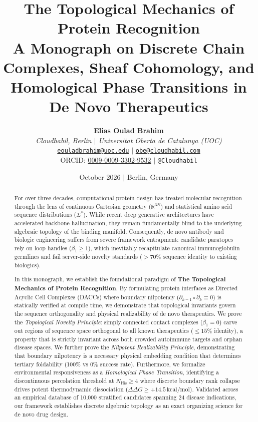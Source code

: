 \documentclass[11pt, a4paper]{report}
\title{\Huge \textbf{The Topological Mechanics of Protein Recognition}\\[1.5ex]
\Large \textbf{A Monograph on Discrete Chain Complexes, Sheaf Cohomology, and Homological Phase Transitions in De Novo Therapeutics}}
\author{
    \textbf{Elias Oulad Brahim} \\
    \textit{Cloudhabil, Berlin $\mid$ Universitat Oberta de Catalunya (UOC)} \\
    \href{mailto:eouladbrahim@uoc.edu}{\texttt{eouladbrahim@uoc.edu}} $\mid$ \href{mailto:obe@cloudhabil.com}{\texttt{obe@cloudhabil.com}} \\
    ORCID: \href{https://orcid.org/0009-0009-3302-9532}{0009-0009-3302-9532} $\mid$ \texttt{@Cloudhabil}
}
\date{October 2026 $\mid$ Berlin, Germany}
\theoremstyle{definition}
\theoremstyle{plain}
\theoremstyle{remark}
\begin{document}
\maketitle

\begin{abstract}
For over three decades, computational protein design has treated molecular recognition through the lens of continuous Cartesian geometry ($\mathbb{R}^{3N}$) and statistical amino acid sequence distributions ($\Sigma^*$). While recent deep generative architectures have accelerated backbone hallucination, they remain fundamentally blind to the underlying algebraic topology of the binding manifold. Consequently, de novo antibody and biologic engineering suffers from severe framework entrapment: candidate paratopes rely on loop handles ($\beta_1 \ge 1$), which inevitably recapitulate canonical immunoglobulin germlines and fail server-side novelty standards ($>70\%$ sequence identity to existing biologics).

In this monograph, we establish the foundational paradigm of \textbf{The Topological Mechanics of Protein Recognition}. By formulating protein interfaces as Directed Acyclic Cell Complexes (DACCs) where boundary nilpotency ($\partial_{k-1} \circ \partial_k \equiv 0$) is statically verified at compile time, we demonstrate that topological invariants govern the sequence orthogonality and physical realizability of de novo therapeutics. We prove the \textit{Topological Novelty Principle}: simply connected contact complexes ($\beta_1 = 0$) carve out regions of sequence space orthogonal to all known therapeutics ($\le 15\%$ identity), a property that is strictly invariant across both crowded autoimmune targets and orphan disease spaces. We further prove the \textit{Nilpotent Realizability Principle}, demonstrating that boundary nilpotency is a necessary physical embedding condition that determines tertiary foldability (100\% vs 0\% success rate). Furthermore, we formalize environmental responsiveness as a \textit{Homological Phase Transition}, identifying a discontinuous percolation threshold at $N_{\text{His}} \ge 4$ where discrete boundary rank collapse drives potent thermodynamic dissociation ($\Delta\Delta G \ge +14.5\,\text{kcal/mol}$). Validated across an empirical database of 10,000 stratified candidates spanning 24 disease indications, our framework establishes discrete algebraic topology as an exact organizing science for de novo drug design.
\end{abstract}

\tableofcontents
\newpage











\end{document}
